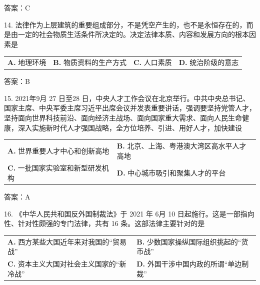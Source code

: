 \documentclass[UTF8,11pt]{ctexart}
\begin{document}
答案：C


14. 法律作为上层建筑的重要组成部分，不是凭空产生的，也不是永恒存在的，而是由一定的社会物质生活条件所决定的。决定法律本质、内容和发展方向的根本因素是


\begin{center}\begin{tabular}{>{\raggedright\arraybackslash}p{\dimexpr(\linewidth-8\tabcolsep)/4\relax}>{\raggedright\arraybackslash}p{\dimexpr(\linewidth-8\tabcolsep)/4\relax}>{\raggedright\arraybackslash}p{\dimexpr(\linewidth-8\tabcolsep)/4\relax}>{\raggedright\arraybackslash}p{\dimexpr(\linewidth-8\tabcolsep)/4\relax}}
\textbf{A.} 地理环境 & \textbf{B.} 物质资料的生产方式 & \textbf{C.} 人口素质 & \textbf{D.} 统治阶级的意志\\[.35em]\end{tabular}\end{center}

答案：B


15. 2021年9月 27 日至28 日，中央人才工作会议在北京举行。中共中央总书记、国家主席、中央军委主席习近平出席会议并发表重要讲话，强调要坚持党管人才，坚持面向世界科技前沿、面向经济主战场、面向国家重大需求、面向人民生命健康，深入实施新时代人才强国战略，全方位培养、引进、用好人才，加快建设


\begin{center}\begin{tabular}{>{\raggedright\arraybackslash}p{\dimexpr(\linewidth-4\tabcolsep)/2\relax}>{\raggedright\arraybackslash}p{\dimexpr(\linewidth-4\tabcolsep)/2\relax}}
\textbf{A.} 世界重要人才中心和创新高地 & \textbf{B.} 北京、上海、粤港澳大湾区高水平人才高地\\[.35em]
\textbf{C.} 一批国家实验室和新型研发机构 & \textbf{D.} 中心城市吸引和聚集人才的平台\\[.35em]\end{tabular}\end{center}

答案：A


16. 《中华人民共和国反外国制裁法》于 2021 年 6月 10 日起施行。这是一部指向性、针对性颇强的专门法律，共有 16 条。这部法律主要针对的是


\begin{center}\begin{tabular}{>{\raggedright\arraybackslash}p{\dimexpr(\linewidth-4\tabcolsep)/2\relax}>{\raggedright\arraybackslash}p{\dimexpr(\linewidth-4\tabcolsep)/2\relax}}
\textbf{A.} 西方某些大国近年来对我国的“贸易战” & \textbf{B.} 少数国家操纵国际组织挑起的“货币战”\\[.35em]
\textbf{C.} 资本主义大国对社会主义国家的“新冷战” & \textbf{D.} 外国干涉中国内政的所谓“单边制裁”\\[.35em]\end{tabular}\end{center}
\end{document}
